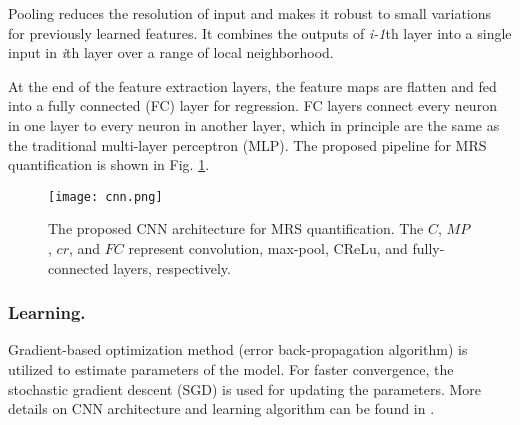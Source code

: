 \documentclass{llncs}
\begin{document}
Pooling reduces the resolution of input and makes it robust to small variations for previously learned features. It combines the outputs of \emph{i-1}th layer into a single input in \emph{i}th layer over a range of local neighborhood. 

At the end of the feature extraction layers, the feature maps are flatten and fed into a fully connected (FC) layer for regression. FC layers connect every neuron in one layer to every neuron in another layer, which in principle are the same as the traditional multi-layer perceptron (MLP). The proposed pipeline for MRS quantification is shown in Fig. \ref{figCNN}.
\begin{figure}[t!]
\texttt{[image: cnn.png]}
\caption{The proposed CNN architecture for MRS quantification. The $C$, $MP$, $cr$, and $FC$ represent convolution, max-pool, CReLu, and fully-connected layers, respectively.}
\label{figCNN}
\end{figure}

\subsubsection{Learning.}

Gradient-based optimization method (error back-propagation algorithm) is utilized to estimate parameters of the model. For faster convergence, the stochastic gradient descent (SGD) is used for updating the parameters. 
More details on CNN architecture and learning algorithm can be found in 
 \cite{lecun1998efficient,Bouvrie06}.
\end{document}
